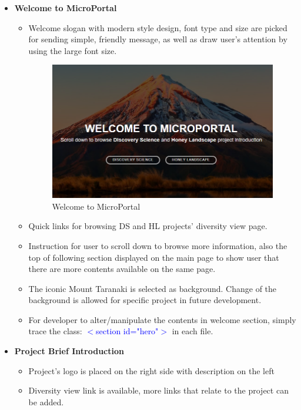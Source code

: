 \documentclass{scrreprt}
\begin{document}
\begin{enumerate}
\begin{itemize}
\item 
\begin{large}\textbf{Welcome to MicroPortal}\end{large}
\begin{itemize}
    \item Welcome slogan with modern style design, font type and size are picked for sending simple, friendly message, as well as draw user's attention by using the large font size.
    \begin{figure}[h!]
    \centering
    \includegraphics[width=10cm,height=6cm]{Welcome.PNG}
    \caption{Welcome to MicroPortal}
    \label{fig:Start Tour}
\end{figure} 
    \item Quick links for browsing DS and HL projects' diversity view page.
    \item Instruction for user to scroll down to browse more information, also the top of following section displayed on the main page to show user that there are more contents available on the same page.
    \item The iconic Mount Taranaki is selected as background. Change of the background is allowed for specific project in future development.
    \item For developer to alter/manipulate the contents in welcome section, simply trace the class: \textcolor{blue}{$<$section id="hero"$>$} in each file.
\end{itemize}
\item 
\begin{large}
\textbf{Project Brief Introduction}
\end{large}
\begin{itemize}
    \item Project's logo is placed on the right side with description on the left
    \item Diversity view link is available, more links that relate to the project can be added. 

\end{itemize}
\end{itemize}
\end{enumerate}
\end{document}
